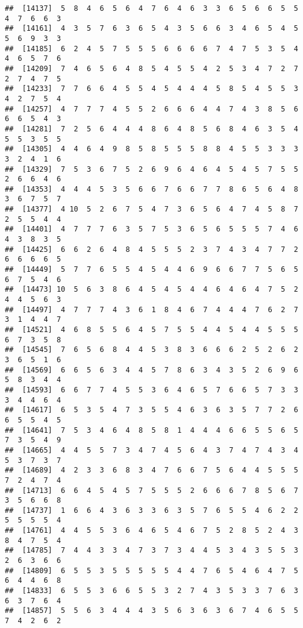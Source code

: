 \documentclass[
]{book}
\begin{document}
\begin{verbatim}
##  [14137]  5  8  4  6  5  6  4  7  6  4  6  3  3  6  5  6  6  5  5  4  7  6  6  3
##  [14161]  4  3  5  7  6  3  6  5  4  3  5  6  6  3  4  6  5  4  5  5  6  9  3  3
##  [14185]  6  2  4  5  7  5  5  5  6  6  6  6  7  4  7  5  3  5  4  4  6  5  7  6
##  [14209]  7  4  6  5  6  4  8  5  4  5  5  4  2  5  3  4  7  2  7  2  7  4  7  5
##  [14233]  7  7  6  6  4  5  5  4  5  4  4  4  5  8  5  4  5  5  3  4  2  7  5  4
##  [14257]  4  7  7  7  4  5  5  2  6  6  6  4  4  7  4  3  8  5  6  6  6  5  4  3
##  [14281]  7  2  5  6  4  4  4  8  6  4  8  5  6  8  4  6  3  5  4  5  5  3  5  5
##  [14305]  4  4  6  4  9  8  5  8  5  5  5  8  8  4  5  5  3  3  3  3  2  4  1  6
##  [14329]  7  5  3  6  7  5  2  6  9  6  4  6  4  5  4  5  7  5  5  2  6  6  4  6
##  [14353]  4  4  4  5  3  5  6  6  7  6  6  7  7  8  6  5  6  4  8  3  6  7  5  7
##  [14377]  4 10  5  2  6  7  5  4  7  3  6  5  6  4  7  4  5  8  7  2  5  5  4  4
##  [14401]  4  7  7  7  6  3  5  7  5  3  6  5  6  5  5  5  7  4  6  4  3  8  3  5
##  [14425]  6  6  2  6  4  8  4  5  5  5  2  3  7  4  3  4  7  7  2  6  6  6  6  5
##  [14449]  5  7  7  6  5  5  4  5  4  4  6  9  6  6  7  7  5  6  5  6  7  5  4  6
##  [14473] 10  5  6  3  8  6  4  5  4  5  4  4  6  4  6  4  7  5  2  4  4  5  6  3
##  [14497]  4  7  7  7  4  3  6  1  8  4  6  7  4  4  4  7  6  2  7  3  1  4  4  7
##  [14521]  4  6  8  5  5  6  4  5  7  5  5  4  4  5  4  4  5  5  5  6  7  3  5  8
##  [14545]  7  6  5  6  8  4  4  5  3  8  3  6  6  6  2  5  2  6  2  3  6  5  1  6
##  [14569]  6  6  5  6  3  4  4  5  7  8  6  3  4  3  5  2  6  9  6  5  8  3  4  4
##  [14593]  6  6  7  7  4  5  5  3  6  4  6  5  7  6  6  5  7  3  3  3  4  4  6  4
##  [14617]  6  5  3  5  4  7  3  5  5  4  6  3  6  3  5  7  7  2  6  6  5  5  4  5
##  [14641]  7  5  3  4  6  4  8  5  8  1  4  4  4  6  6  5  5  6  5  7  3  5  4  9
##  [14665]  4  4  5  5  7  3  4  7  4  5  6  4  3  7  4  7  4  3  4  5  3  7  3  7
##  [14689]  4  2  3  3  6  8  3  4  7  6  6  7  5  6  4  4  5  5  5  7  2  4  7  4
##  [14713]  6  6  4  5  4  5  7  5  5  5  2  6  6  6  7  8  5  6  7  3  5  6  6  8
##  [14737]  1  6  6  4  3  6  3  3  6  3  5  7  6  5  5  4  6  2  2  5  5  5  5  4
##  [14761]  4  4  5  5  3  6  4  6  5  4  6  7  5  2  8  5  2  4  3  8  4  7  5  4
##  [14785]  7  4  4  3  3  4  7  3  7  3  4  4  5  3  4  3  5  5  3  2  6  3  6  6
##  [14809]  6  5  5  3  5  5  5  5  5  4  4  7  6  5  4  6  4  7  5  6  4  4  6  8
##  [14833]  6  5  5  3  6  6  5  5  3  2  7  4  3  5  3  3  7  6  3  6  3  7  6  4
##  [14857]  5  5  6  3  4  4  4  3  5  6  3  6  3  6  7  4  6  5  5  7  4  2  6  2

\end{verbatim}
\end{document}
